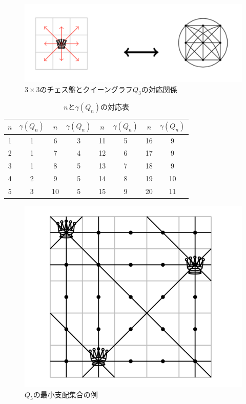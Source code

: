  \begin{figure}[htb]
   \centering
   \includegraphics[width=1.0\linewidth]{fig/fig-queen_3_graph.pdf}
   \caption{$3 \times 3$のチェス盤とクイーングラフ$Q_3$の対応関係}
   \label{ex:queengraph_3}
 \end{figure}

\begin{table}[hbtp]
   \centering
   \caption{$n$と$\gamma(Q_n)$の対応表}
   \begin{tabular}{c|c||c|c||c|c||c|c} \hline
    $n$ & $\gamma(Q_{n})$ & $n$ & $\gamma(Q_{n})$ &$n$ & $\gamma(Q_{n})$ &$n$ & $\gamma(Q_{n})$ \\ \hline \hline
    1 &1 &6 &3 &11 &5 &16 &9 \\ \hline
    2 &1 &7 &4 &12 &6 &17 &9 \\ \hline
    3 &1 &8 &5 &13 &7 &18 &9 \\ \hline
    4 &2 &9 &5 &14 &8 &19 &10 \\ \hline
    5 &3 &10 &5 &15 &9 &20 &11 \\ \hline
   \end{tabular}
   \label{tb:queen_n}
  \end{table}


\begin{figure}[htb]
  \centering
  \includegraphics[width=0.6 \linewidth]{fig/fig-queen_5.pdf}
  \caption{$Q_5$の最小支配集合の例}
  \label{ex:queengraph5}
\end{figure}

